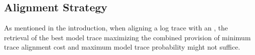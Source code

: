 
\subsection{Alignment Strategy}\label{subsec:as}
As mentioned in the introduction, when aligning a log trace with an \uswn, the retrieval of the best model trace maximizing the combined provision of minimum trace alignment cost and maximum model trace probability might not suffice.
